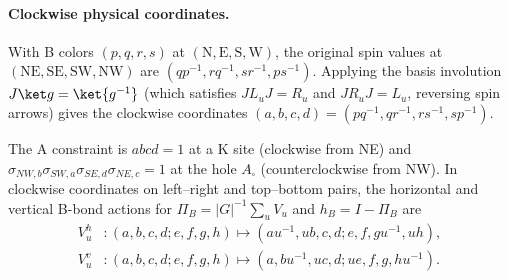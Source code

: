 \paragraph{Clockwise physical coordinates.}
With B colors $(p,q,r,s)$ at $(\text{N},\text{E},\text{S},\text{W})$, the original spin values at $(\text{NE},\text{SE},\text{SW},\text{NW})$ are $(qp^{-1},rq^{-1},sr^{-1},ps^{-1})$. Applying the basis involution $J\ket g=\ket{g^{-1}}$ (which satisfies $JL_uJ=R_u$ and $JR_uJ=L_u$, reversing spin arrows) gives the clockwise coordinates
$(a,b,c,d)=(pq^{-1},qr^{-1},rs^{-1},sp^{-1})$.

The A constraint is $abcd=1$ at a K site (clockwise from NE) and $\sigma_{NW,b}\sigma_{SW,a}\sigma_{SE,d}\sigma_{NE,c}=1$ at the hole $A_\square$ (counterclockwise from NW).
In clockwise coordinates on left--right and top--bottom pairs, the horizontal and vertical B-bond actions for $\Pi_B=|G|^{-1}\sum_uV_u$ and $h_B=I-\Pi_B$ are
\begin{align}
    V_u^h & : (a,b,c,d;e,f,g,h)
    \longmapsto(au^{-1},ub,c,d;e,f,gu^{-1},uh), \\
    V_u^v & : (a,b,c,d;e,f,g,h)
    \longmapsto(a,bu^{-1},uc,d;ue,f,g,hu^{-1}).
    \label{eq:peps_source_bond_actions}
\end{align}

